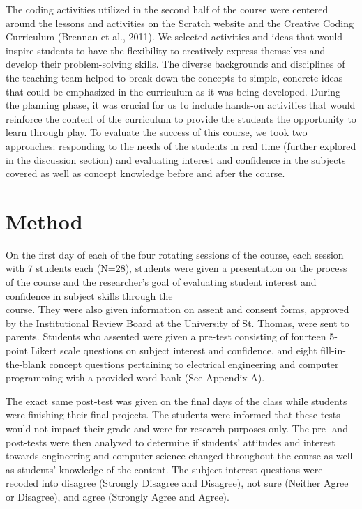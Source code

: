 \documentclass[11.5pt]{sig-alternate}
\begin{document}
\begin{large}
The coding activities utilized in the second half of the course were centered around the lessons and activities on the Scratch website and the Creative Coding Curriculum (Brennan et al., 2011). We selected activities and ideas that would inspire students to have the flexibility to creatively express themselves and develop their problem-solving skills. The diverse backgrounds and disciplines of the teaching team helped to break down the concepts to simple, concrete ideas that could be emphasized in the curriculum as it was being developed. During the planning phase, it was crucial for us to include hands-on activities that would reinforce the content of the curriculum to provide the students the opportunity to learn through play. To evaluate the success of this course, we took two approaches: responding to the needs of the students in real time (further explored in the discussion section) and evaluating interest and confidence in the subjects covered as well as concept knowledge before and after the course.

\section*{ Method}

On the first day of each of the four rotating sessions of the course, each session with 7 students each (N=28), students were given a presentation on the process of the course and the researcher’s goal of evaluating student interest and confidence in subject skills through the \\ course. They were also given information on assent and consent forms, approved by the Institutional Review Board at the University of St. Thomas, were sent to parents. Students who assented were given a pre-test consisting of fourteen 5-point Likert scale questions on subject interest and confidence, and eight fill-in-the-blank concept questions pertaining to electrical engineering and computer programming with a provided word bank (See Appendix A).

The exact same post-test was given on the final days of the class while students were finishing their final projects. The students were informed that these tests would not impact their grade and were for research purposes only. The pre- and post-tests were then analyzed to determine if students’ attitudes and interest towards engineering and computer science changed throughout the course as well as students' knowledge of the content. The subject interest questions were recoded into disagree (Strongly Disagree and Disagree), not sure (Neither Agree or Disagree), and agree (Strongly Agree and Agree).


\end{large}
\end{document}
